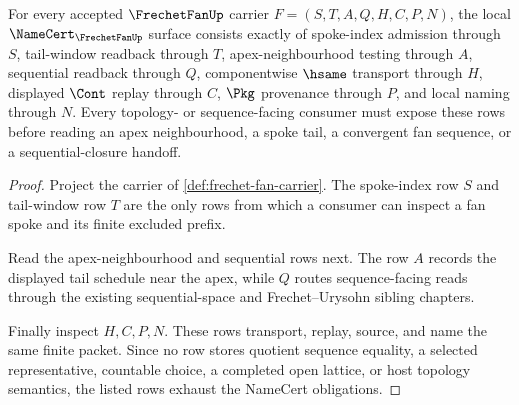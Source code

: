 \begin{theorem}
\label{thm:frechet-fan-namecert-obligations}
For every accepted $\FrechetFanUp$ carrier $F=(S,T,A,Q,H,C,P,N)$, the local $\NameCert_{\FrechetFanUp}$ surface consists exactly of spoke-index admission through $S$, tail-window readback through $T$, apex-neighbourhood testing through $A$, sequential readback through $Q$, componentwise $\hsame$ transport through $H$, displayed $\Cont$ replay through $C$, $\Pkg$ provenance through $P$, and local naming through $N$. Every topology- or sequence-facing consumer must expose these rows before reading an apex neighbourhood, a spoke tail, a convergent fan sequence, or a sequential-closure handoff.
\end{theorem}
\begin{proof}
Project the carrier of \autoref{def:frechet-fan-carrier}. The spoke-index row $S$ and tail-window row $T$ are the only rows from which a consumer can inspect a fan spoke and its finite excluded prefix.

Read the apex-neighbourhood and sequential rows next. The row $A$ records the displayed tail schedule near the apex, while $Q$ routes sequence-facing reads through the existing sequential-space and Frechet--Urysohn sibling chapters.

Finally inspect $H,C,P,N$. These rows transport, replay, source, and name the same finite packet. Since no row stores quotient sequence equality, a selected representative, countable choice, a completed open lattice, or host topology semantics, the listed rows exhaust the NameCert obligations.
\end{proof}

